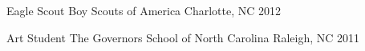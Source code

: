 

\begin{cvhonors}

      \cvhonor
        {Eagle Scout} %
        {Boy Scouts of America} %
        {Charlotte, NC} %
        {2012} %
    
      \cvhonor
        {Art Student} %
        {The Governors School of North Carolina} %
        {Raleigh, NC} %
        {2011} %
    
    \end{cvhonors}
    
